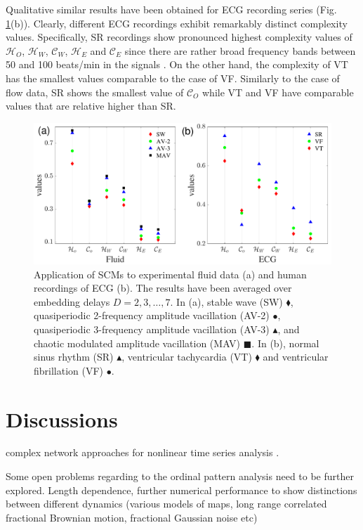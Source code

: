 \documentclass[12pt,aip,cha,reprint,nofootinbib]{revtex4-1}
\begin{document}
Qualitative similar results have been obtained for ECG recording series (Fig. \ref{fig:fluid}(b)). Clearly, different ECG recordings exhibit remarkably distinct complexity values. Specifically, SR recordings show pronounced highest complexity values of $\mathcal{H}_O$, $\mathcal{H}_W$, $\mathcal{C}_W$, $\mathcal{H}_E$ and $\mathcal{C}_E$ since there are rather broad frequency bands between 50 and 100 beats/min in the signals \cite{smallCSF2002}. On the other hand, the complexity of VT has the smallest values comparable to the case of VF. Similarly to the case of flow data, SR shows the smallest value of $\mathcal{C}_O$ while VT and VF have comparable values that are relative higher than SR. 
\begin{figure}
	\centering 
	\includegraphics[width=2\columnwidth]{fluidExample.pdf}
\caption{\small{Application of SCMs to experimental fluid data (a) and human recordings of ECG (b). The results have been averaged over embedding delays $D = 2, 3, \dots, 7$. In (a), stable wave (SW) $\blacklozenge$, quasiperiodic 2-frequency amplitude vacillation (AV-2) $\bullet$, quasiperiodic 3-frequency amplitude vacillation (AV-3) $\blacktriangle$, and chaotic modulated amplitude vacillation (MAV) $\blacksquare$. In (b), normal sinus rhythm (SR) $\blacktriangle$, ventricular tachycardia (VT) $\blacklozenge$ and ventricular fibrillation (VF) $\bullet$. } \label{fig:fluid}}
\end{figure}


\section{Discussions} \label{sec:con}
complex network approaches for nonlinear time series analysis \cite{ZouPR2018}. 

Some open problems regarding to the ordinal pattern analysis need to be further explored. Length dependence, further numerical performance to show distinctions between different dynamics (various models of maps, long range correlated fractional Brownian motion, fractional Gaussian noise etc)
\end{document}
